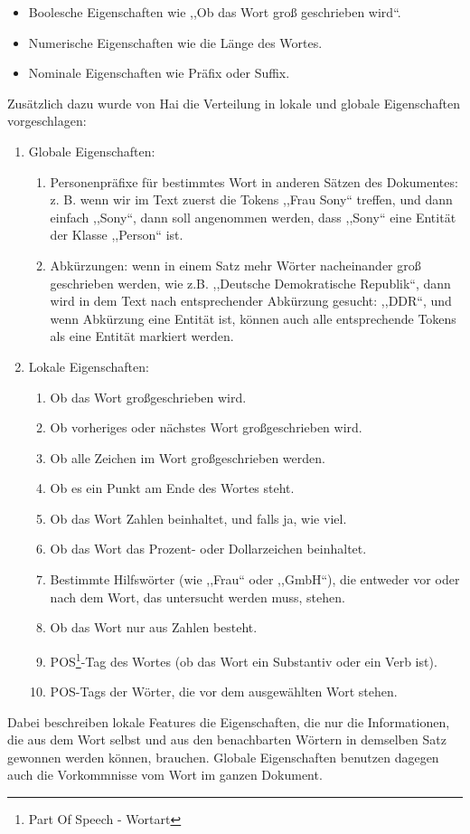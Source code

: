 \begin{itemize}
\item Boolesche Eigenschaften wie ,,Ob das Wort groß geschrieben wird``.
\item Numerische Eigenschaften wie die Länge des Wortes.
\item Nominale Eigenschaften wie Präfix oder Suffix.
\end{itemize}
Zusätzlich dazu wurde von Hai\cite{chieu2002named} die Verteilung in lokale und globale Eigenschaften vorgeschlagen:

\begin{enumerate}
\item Globale Eigenschaften:
\begin{enumerate}
\item Personenpräfixe für bestimmtes Wort in anderen Sätzen des Dokumentes: z. B. wenn wir im Text zuerst die Tokens ,,Frau Sony`` treffen, und dann einfach ,,Sony``, dann soll angenommen werden, dass ,,Sony`` eine Entität der Klasse ,,Person`` ist.
\item Abkürzungen: wenn in einem Satz mehr Wörter nacheinander groß geschrieben werden, wie z.B. ,,Deutsche Demokratische Republik``, dann wird in dem Text nach entsprechender Abkürzung gesucht: ,,DDR``, und wenn Abkürzung eine Entität ist, können auch alle entsprechende Tokens als eine Entität markiert werden.
\end{enumerate}
\item Lokale Eigenschaften:
\begin{enumerate}
\item Ob das Wort großgeschrieben wird.
\item Ob vorheriges oder nächstes Wort großgeschrieben wird.
\item Ob alle Zeichen im Wort großgeschrieben werden.
\item Ob es ein Punkt am Ende des Wortes steht.
\item Ob das Wort Zahlen beinhaltet, und falls ja, wie viel.
\item Ob das Wort das Prozent- oder Dollarzeichen beinhaltet.
\item Bestimmte Hilfswörter (wie ,,Frau`` oder ,,GmbH``), die entweder vor oder nach dem Wort, das untersucht werden muss, stehen.
\item Ob das Wort nur aus Zahlen besteht.
\item POS\footnote{Part Of Speech - Wortart}-Tag des Wortes (ob das Wort ein Substantiv oder ein Verb ist).
\item POS-Tags der Wörter, die vor dem ausgewählten Wort stehen.
\end{enumerate}
\end{enumerate}
Dabei beschreiben lokale Features die Eigenschaften, die nur die Informationen, die aus dem Wort selbst und aus den benachbarten Wörtern in demselben Satz gewonnen werden können, brauchen. Globale Eigenschaften benutzen dagegen auch die Vorkommnisse vom Wort im ganzen Dokument.

